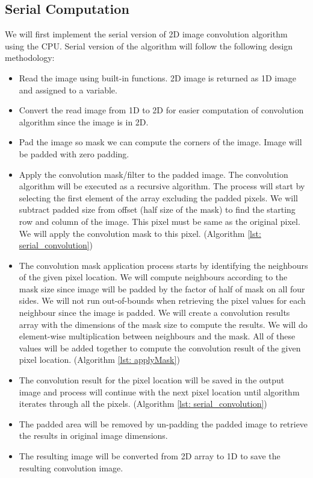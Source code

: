 \subsection{Serial Computation}
We will first implement the serial version of 2D image convolution algorithm using the CPU. Serial version of the algorithm will follow the following design methodology:
\begin{itemize}[leftmargin=0em]
  \setlength{\itemsep}{0pt}
  \item Read the image using built-in functions. 2D image is returned as 1D image and assigned to a variable.
  \item Convert the read image from 1D to 2D for easier computation of convolution algorithm since the image is in 2D.
  \item Pad the image so mask we can compute the corners of the image. Image will be padded with zero padding. 
  \item Apply the convolution mask/filter to the padded image. The convolution algorithm will be executed as a recursive algorithm. The process will start by selecting the first element of the array excluding the padded pixels. We will subtract padded size from offset (half size of the mask) to find the starting row and column of the image. This pixel must be same as the original pixel. We will apply the convolution mask to this pixel. (Algorithm \ref{lst: serial_convolution})
  \item The convolution mask application process starts by identifying the neighbours of the given pixel location. We will compute neighbours according to the mask size since image will be padded by the factor of half of mask on all four sides. We will not run out-of-bounds when retrieving the pixel values for each neighbour since the image is padded. We will create a convolution results array with the dimensions of the mask size to compute the results. We will do element-wise multiplication between neighbours and the mask. All of these values will be added together to compute the convolution result of the given pixel location. (Algorithm \ref{lst: applyMask})
  \item The convolution result for the pixel location will be saved in the output image and process will continue with the next pixel location until algorithm iterates through all the pixels. (Algorithm \ref{lst: serial_convolution})
  \item The padded area will be removed by un-padding the padded image to retrieve the results in original image dimensions.
  \item The resulting image will be converted from 2D array to 1D to save the resulting convolution image. 
\end{itemize}

